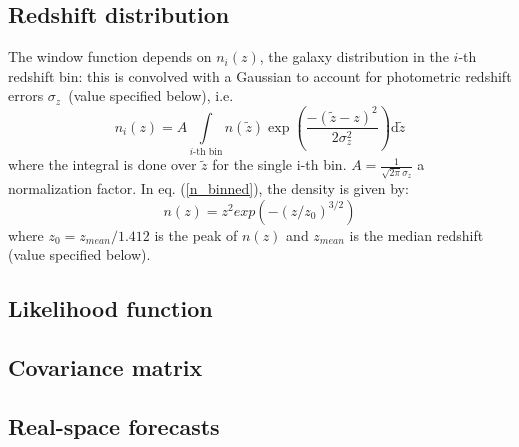 \subsection{Redshift distribution}

The window function depends on $n_{i}(z)$, the galaxy distribution
in the $i$-th redshift bin: this is convolved with a Gaussian to account for photometric
redshift errors $\sigma_{z}$~(value specified below), i.e.~
\begin{equation}
n_{i}(z)=A \int\limits _{i\text{-th bin}}n({\tilde z})\exp\left(\frac{-(\tilde{z}-z)^{2}}{2 \sigma_{z}^{2}}\right)\mathrm{d}\tilde{z}
\label{n_binned}
\end{equation}
 where the integral is done over $\tilde{z}$ for the single i-th bin. 
$A = \frac{1}{\sqrt{2\pi} \sigma_z}$ a normalization factor.
In eq. (\ref{n_binned}), the density is given by: 
\begin{equation}
n(z) = z^2 exp(-(z/z_0)^{3/2})
\end{equation}
where $z_0 = z_{mean}/1.412$ is the peak of $n(z)$ and $z_{mean}$ is the median redshift (value specified below).

\subsection{Likelihood function}


\subsection{Covariance matrix}


\subsection{Real-space forecasts}

